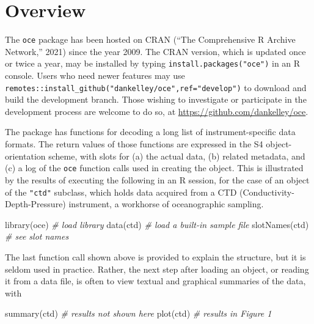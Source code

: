 \documentclass[10pt,a4paper,onecolumn]{article}
\newenvironment{Shaded}{\begin{snugshade}}{\end{snugshade}}
\newcommand{\CommentTok}[1]{\textcolor[rgb]{0.56,0.35,0.01}{\textit{#1}}}
\newcommand{\FunctionTok}[1]{\textcolor[rgb]{0.00,0.00,0.00}{#1}}
\newcommand{\NormalTok}[1]{#1}
\begin{document}
\hypertarget{overview}{%
\section{Overview}\label{overview}}

The \texttt{oce} package has been hosted on CRAN ({``The {Comprehensive}
{R} {Archive} {Network},''} 2021) since the year 2009. The CRAN version,
which is updated once or twice a year, may be installed by typing
\texttt{install.packages("oce")} in an R console. Users who need newer
features may use
\texttt{remotes::install\_github("dankelley/oce",ref="develop")} to
download and build the development branch. Those wishing to investigate
or participate in the development process are welcome to do so, at
\url{https://github.com/dankelley/oce}.

The package has functions for decoding a long list of
instrument-specific data formats. The return values of those functions
are expressed in the S4 object-orientation scheme, with slots for (a)
the actual data, (b) related metadata, and (c) a log of the \texttt{oce}
function calls used in creating the object. This is illustrated by the
results of executing the following in an R session, for the case of an
object of the \texttt{"ctd"} subclass, which holds data acquired from a
CTD (Conductivity-Depth-Pressure) instrument, a workhorse of
oceanographic sampling.

\begin{Shaded}
\begin{Highlighting}[]
\FunctionTok{library}\NormalTok{(oce)                           }\CommentTok{\# load library}
\FunctionTok{data}\NormalTok{(ctd)                              }\CommentTok{\# load a built{-}in sample file}
\FunctionTok{slotNames}\NormalTok{(ctd)                         }\CommentTok{\# see \textquotesingle{}slot\textquotesingle{} names}
\end{Highlighting}
\end{Shaded}

The last function call shown above is provided to explain the structure,
but it is seldom used in practice. Rather, the next step after loading
an object, or reading it from a data file, is often to view textual and
graphical summaries of the data, with

\begin{Shaded}
\begin{Highlighting}[]
\FunctionTok{summary}\NormalTok{(ctd)                           }\CommentTok{\# results not shown here}
\FunctionTok{plot}\NormalTok{(ctd)                              }\CommentTok{\# results in Figure 1}
\end{Highlighting}
\end{Shaded}
\end{document}
